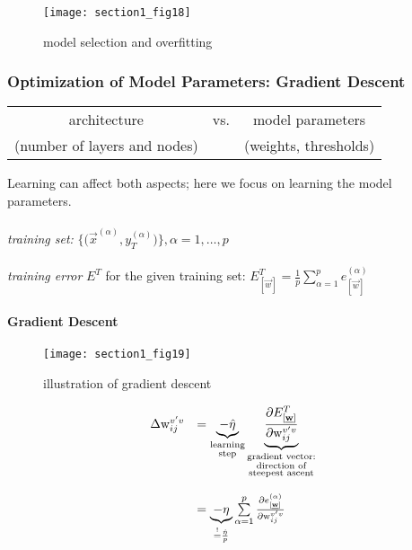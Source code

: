 \begin{figure}[h]
  \centering
 \texttt{[image: section1\_fig18]}   
  \caption{model selection and overfitting}
\end{figure}


\subsubsection{Optimization of Model Parameters: Gradient Descent}
  \begin{center}
  \begin{tabular}{c c c}
architecture & vs. & model parameters\\
{\footnotesize (number of layers and nodes)} & & {\footnotesize(weights, thresholds)}    
  \end{tabular}
  \end{center}
Learning can affect both aspects; here we focus on learning the model parameters.\\\\
\emph{training set:} $\Big\{ \Big (\vec{x}^{(\alpha)}, y_T^{(\alpha)} \Big) \Big\}, \alpha = 1, \ldots, p$
\\\\
\emph{training error} $E^T$ for the given training set: $E_{[\vec{w}]}^T = \frac{1}{p} \sum\limits_{\alpha = 1}^p e_{[\vec{w}]}^{(\alpha)}$

\paragraph{Gradient Descent}
\begin{figure}[h]
  \centering
\texttt{[image: section1\_fig19]}  
  \caption{illustration of gradient descent}
\end{figure}

\begin{equation}
	\begin{array}{ll}
	\Delta \mathrm{w}_{ij}^{v'v} 
	& = \underbrace{-\hat{\eta}}_{ \substack{\text{learning} \\ 
			\text{step} } }
		\underbrace{\frac{\partial E_{[\underline{\mathbf{w}}]}^T}{
			\partial \mathrm{w}_{ij}^{v'v}}}_{
				\substack{
					\text{gradient vector:} \\ 
					\text{direction of} \\
					\text{steepest ascent} } } \\\\
	& = \underbrace{-\eta}_{\stackrel{\mathrm{!}}{=} \frac{\hat{\eta}}{p}}
		\sum\limits_{\alpha = 1}^p \frac{\partial e_{[\underline{\mathbf{w}}]}^{(\alpha)}}{
			\partial \mathrm{w}_{ij}^{v'v}}
	\end{array}
\end{equation}
